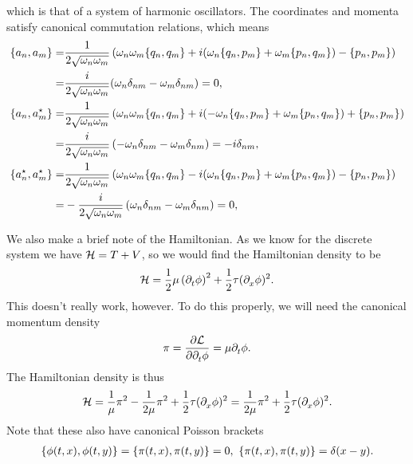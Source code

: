 which is that of a system of harmonic oscillators. The coordinates and momenta satisfy canonical commutation relations, which means
\begin{align*}
	\pb{a_{n}}{a_{m}}      =& \frac{1}{2\sqrt{\omega_{n}\omega_{m}}}\left(\omega_{n}\omega_{m}\pb{q_{n}}{q_{m}} + i(\omega_{n}\pb{q_{n}}{p_{m}} + \omega_{m}\pb{p_{n}}{q_{m}}) - \pb{p_{n}}{p_{m}}\right)  \\
	                        =& \frac{i}{2\sqrt{\omega_{n}\omega_{m}}}(\omega_{n}\delta_{nm} -  \omega_{m}\delta_{nm}) = 0, \\
	\pb{a_{n}}{a_{m}\cc}    =& \frac{1}{2\sqrt{\omega_{n}\omega_{m}}}\left(\omega_{n}\omega_{m}\pb{q_{n}}{q_{m}} + i(-\omega_{n}\pb{q_{n}}{p_{m}} + \omega_{m}\pb{p_{n}}{q_{m}}) + \pb{p_{n}}{p_{m}}\right) \\
	                        =& \frac{i}{2\sqrt{\omega_{n}\omega_{m}}}\left(-\omega_{n}\delta_{nm} - \omega_{m}\delta_{nm}\right) = -i\delta_{nm}, \\
	\pb{a_{n}\cc}{a_{m}\cc} =& \frac{1}{2\sqrt{\omega_{n}\omega_{m}}}\left(\omega_{n}\omega_{m}\pb{q_{n}}{q_{m}} - i(\omega_{n}\pb{q_{n}}{p_{m}} + \omega_{m}\pb{p_{n}}{q_{m}}) - \pb{p_{n}}{p_{m}}\right) \\
	                        =& -\frac{i}{2\sqrt{\omega_{n}\omega_{m}}}\left(\omega_{n}\delta_{nm} - \omega_{m}\delta_{nm}\right) = 0,
\end{align*}

We also make a brief note of the Hamiltonian. As we know for the discrete system we have $\mathcal{H} = T + V$, so we would find the Hamiltonian density to be
\begin{align*}
	\mathcal{H} = \frac{1}{2}\mu\left(\partial^{}_{t}{\phi}\right)^{2} + \frac{1}{2}\tau(\partial^{}_{x}{\phi})^{2}.
\end{align*}
This doesn't really work, however. To do this properly, we will need the canonical momentum density
\begin{align*}
	\pi = \pdv{\ensuremath{\mathcal{L}}}{\ensuremath{\partial^{}_{t}}{\phi}} = \mu\partial^{}_{t}{\phi}.
\end{align*}
The Hamiltonian density is thus
\begin{align*}
	\mathcal{H} = \frac{1}{\mu}\pi^{2} - \frac{1}{2\mu}\pi^{2} + \frac{1}{2}\tau(\partial^{}_{x}{\phi})^{2} = \frac{1}{2\mu}\pi^{2} + \frac{1}{2}\tau(\partial^{}_{x}{\phi})^{2}.
\end{align*}
Note that these also have canonical Poisson brackets
\begin{align*}
	\pb{\phi(t, x)}{\phi(t, y)} = \pb{\pi(t, x)}{\pi(t, y)} = 0,\ \pb{\pi(t, x)}{\pi(t, y)} = \delta(x - y).
\end{align*}

